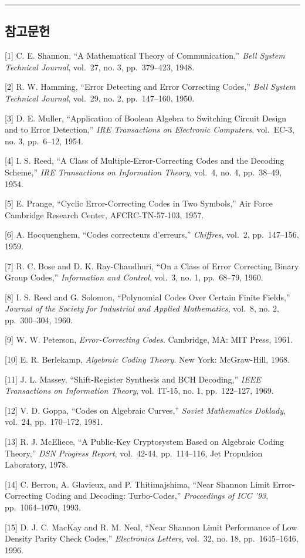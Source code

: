 \documentclass[
  oneside]{article}
\begin{document}
\begin{center}\rule{0.5\linewidth}{0.5pt}\end{center}

\subsection{참고문헌}\label{uxcc38uxace0uxbb38uxd5cc}

{[}1{]} C. E. Shannon, ``A Mathematical Theory of Communication,''
\emph{Bell System Technical Journal}, vol.~27, no. 3, pp.~379--423,
1948.

{[}2{]} R. W. Hamming, ``Error Detecting and Error Correcting Codes,''
\emph{Bell System Technical Journal}, vol.~29, no. 2, pp.~147--160,
1950.

{[}3{]} D. E. Muller, ``Application of Boolean Algebra to Switching
Circuit Design and to Error Detection,'' \emph{IRE Transactions on
Electronic Computers}, vol.~EC-3, no. 3, pp.~6--12, 1954.

{[}4{]} I. S. Reed, ``A Class of Multiple-Error-Correcting Codes and the
Decoding Scheme,'' \emph{IRE Transactions on Information Theory},
vol.~4, no. 4, pp.~38--49, 1954.

{[}5{]} E. Prange, ``Cyclic Error-Correcting Codes in Two Symbols,'' Air
Force Cambridge Research Center, AFCRC-TN-57-103, 1957.

{[}6{]} A. Hocquenghem, ``Codes correcteurs d'erreurs,''
\emph{Chiffres}, vol.~2, pp.~147--156, 1959.

{[}7{]} R. C. Bose and D. K. Ray-Chaudhuri, ``On a Class of Error
Correcting Binary Group Codes,'' \emph{Information and Control}, vol.~3,
no. 1, pp.~68--79, 1960.

{[}8{]} I. S. Reed and G. Solomon, ``Polynomial Codes Over Certain
Finite Fields,'' \emph{Journal of the Society for Industrial and Applied
Mathematics}, vol.~8, no. 2, pp.~300--304, 1960.

{[}9{]} W. W. Peterson, \emph{Error-Correcting Codes}. Cambridge, MA:
MIT Press, 1961.

{[}10{]} E. R. Berlekamp, \emph{Algebraic Coding Theory}. New York:
McGraw-Hill, 1968.

{[}11{]} J. L. Massey, ``Shift-Register Synthesis and BCH Decoding,''
\emph{IEEE Transactions on Information Theory}, vol.~IT-15, no. 1,
pp.~122--127, 1969.

{[}12{]} V. D. Goppa, ``Codes on Algebraic Curves,'' \emph{Soviet
Mathematics Doklady}, vol.~24, pp.~170--172, 1981.

{[}13{]} R. J. McEliece, ``A Public-Key Cryptosystem Based on Algebraic
Coding Theory,'' \emph{DSN Progress Report}, vol.~42-44, pp.~114--116,
Jet Propulsion Laboratory, 1978.

{[}14{]} C. Berrou, A. Glavieux, and P. Thitimajshima, ``Near Shannon
Limit Error-Correcting Coding and Decoding: Turbo-Codes,''
\emph{Proceedings of ICC '93}, pp.~1064--1070, 1993.

{[}15{]} D. J. C. MacKay and R. M. Neal, ``Near Shannon Limit
Performance of Low Density Parity Check Codes,'' \emph{Electronics
Letters}, vol.~32, no. 18, pp.~1645--1646, 1996.
\end{document}
